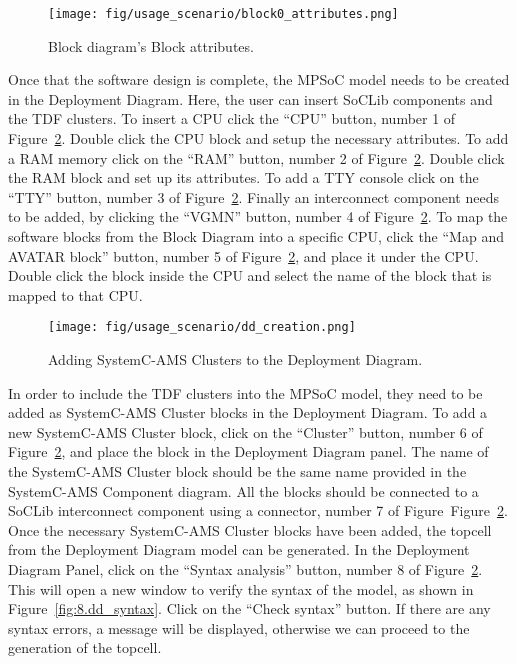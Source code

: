 \begin{figure}[h]
    \centering
    \texttt{[image: fig/usage\_scenario/block0\_attributes.png]}
    \caption{Block diagram's Block attributes.}
    \label{fig:8.block0_attributes}
\end{figure}

Once that the software design is complete, the MPSoC model needs to be created in the Deployment Diagram. Here, the user can insert SoCLib components and the TDF clusters. To insert a CPU click the ``CPU'' button, number 1 of Figure~\ref{fig:8.dd_creation}. Double click the CPU block and setup the necessary attributes.
To add a RAM memory click on the ``RAM'' button, number 2 of Figure~\ref{fig:8.dd_creation}. Double click the RAM block and set up its attributes. 
To add a TTY console click on the ``TTY'' button, number 3 of Figure~\ref{fig:8.dd_creation}. Finally an interconnect component needs to be added, by clicking the ``VGMN'' button, number 4 of Figure~\ref{fig:8.dd_creation}. To map the software blocks from the Block Diagram into a specific CPU, click the ``Map and AVATAR block'' button, number 5 of Figure~\ref{fig:8.dd_creation}, and place it under the CPU. Double click the block inside the CPU and select the name of the block that is mapped to that CPU. 


\begin{figure}[h]
         \centering
         \texttt{[image: fig/usage\_scenario/dd\_creation.png]}
         \caption{Adding SystemC-AMS Clusters to the Deployment Diagram.}
         \label{fig:8.dd_creation}
\end{figure}

In order to include the TDF clusters into the MPSoC model, they need to be added as SystemC-AMS Cluster blocks in the Deployment Diagram. To add a new SystemC-AMS Cluster block, click on the ``Cluster'' button, number 6 of Figure~\ref{fig:8.dd_creation}, and place the block in the Deployment Diagram panel. The name of the SystemC-AMS Cluster block should be the same name provided in the SystemC-AMS Component diagram. All the blocks should be connected to a SoCLib interconnect component using a connector, number 7 of Figure~Figure~\ref{fig:8.dd_creation}. Once the necessary SystemC-AMS Cluster blocks have been added, the topcell from the Deployment Diagram model can be generated. In the Deployment Diagram Panel, click on the ``Syntax analysis'' button, number 8 of Figure~\ref{fig:8.dd_creation}. This will open a new window to verify the syntax of the model, as shown in Figure~\ref{fig:8.dd_syntax}. Click on the ``Check syntax'' button. If there are any syntax errors, a message will be displayed, otherwise we can proceed to the generation of the topcell. 

